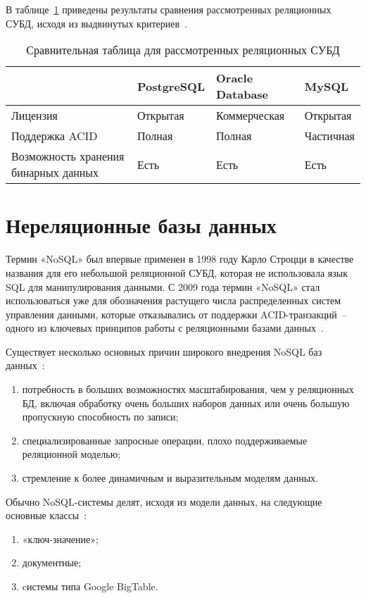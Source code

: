 В таблице~\ref{table:compareRelDBs} приведены результаты сравнения рассмотренных реляционных СУБД, исходя из выдвинутых критериев~\cite{cmpSCDB6}.
\begin{table}[h!]
	\begin{center}
		\caption{\label{table:compareRelDBs} Сравнительная таблица для рассмотренных реляционных СУБД}
		\begin{tabular}{|p{100pt}|p{100pt}|p{120pt}|p{120pt}|}
			\hline
			~ & PostgreSQL & Oracle Database & MySQL \\ \hline
			Лицензия & Открытая & Коммерческая & Открытая \\ \hline
			Поддержка ACID & Полная & Полная & Частичная \\ \hline
			Возможность хранения бинарных данных & Есть & Есть & Есть \\ \hline
		\end{tabular}
	\end{center}
\end{table}

\section{Нереляционные базы данных}

Термин «NoSQL» был впервые применен в 1998 году Карло Строцци в качестве названия для его небольшой реляционной СУБД, которая не использовала язык SQL для манипулирования данными.
С 2009 года термин «NoSQL» стал использоваться уже для обозначения растущего числа распределенных систем управления данными, которые отказывались от поддержки ACID-транзакций~-- одного из ключевых принципов работы с реляционными базами данных~\cite{nosql}.

Существует несколько основных причин широкого внедрения NoSQL баз данных~\cite{highloadApps}:
\begin{enumerate}
	\item потребность в больших возможностях масштабирования, чем у реляционных БД, включая обработку очень больших наборов данных или очень большую пропускную способность по записи;
	\item специализированные запросные операции, плохо поддерживаемые реляционной моделью;
	\item стремление к более динамичным и выразительным моделям данных.
\end{enumerate}

Обычно NoSQL-системы делят, исходя из модели данных, на следующие основные классы~\cite{nosql}:
\begin{enumerate}
	\item «ключ-значение»;
	\item документные;
	\item cистемы типа Google BigTable.
\end{enumerate}

